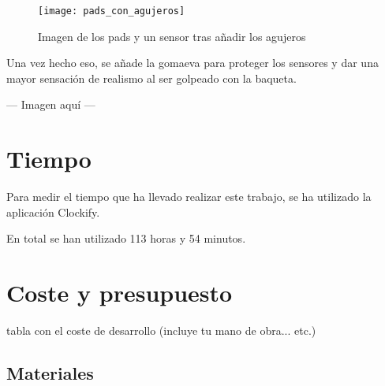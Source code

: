             \begin{figure}[ht]
                \centering
                \texttt{[image: pads\_con\_agujeros]}
                \caption{Imagen de los pads y un sensor tras añadir los agujeros\label{fig:PadsAgujeros}}
            \end{figure}

            Una vez hecho eso, se añade la gomaeva para proteger los sensores y dar una mayor sensación de realismo al
            ser golpeado con la baqueta.

            --- Imagen aquí ---



    \section{Tiempo} %
    \label{sec:Tiempo}

        Para medir el tiempo que ha llevado realizar este trabajo, se ha utilizado la aplicación
        Clockify\cite{clockify}.\newline

        En total se han utilizado 113 horas y 54 minutos.%


    \section{Coste y presupuesto} %
    \label{sec:CosteYPresupuesto}

        tabla con el coste de desarrollo (incluye tu mano de obra... etc.)

        \subsection{Materiales} %
        \label{sub:Materiales}

